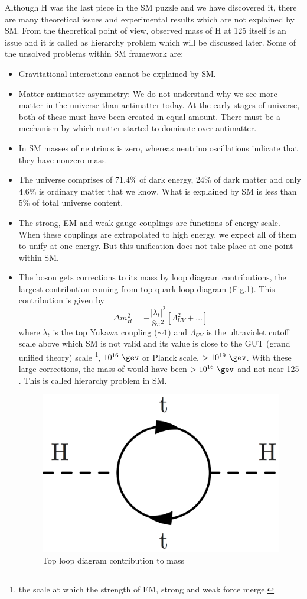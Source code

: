 Although H was the last piece in the SM puzzle and we have discovered it, there are many theoretical issues and experimental results which are not explained by SM. From the theoretical point of view, observed mass of H at 125 \gev itself is an issue and it is called as hierarchy problem which will be discussed later. Some of the unsolved problems within SM framework are:
\begin{itemize}
\item Gravitational interactions cannot be explained by SM.
\item Matter-antimatter asymmetry: We do not understand why we see more matter in the universe than antimatter today. At the early stages of universe, both of these must have been created in equal amount. There must be a mechanism by which matter started to dominate over antimatter.
\item In SM masses of neutrinos is zero, whereas neutrino oscillations \cite{Fukuda:1998mi} indicate that they have nonzero mass.
\item The universe comprises of 71.4\% of dark energy, 24\% of dark matter and only 4.6\% is ordinary matter that we know. What is explained by SM is less than 5\% of total universe content.
\item The strong, EM and weak gauge couplings are functions of energy scale. When these couplings are extrapolated to high energy, we expect all of them to unify at one energy. But this unification does not take place at one point within SM.
\item The \higgs boson gets corrections to its mass by loop diagram contributions, the largest contribution coming from top quark loop diagram (Fig.\ref{fig:hierarchy_problem_higgs}). This contribution is given by
\begin{equation}
\Delta m_{H}^2 = -\frac{|\lambda_t|^2}{8\pi^2}[\Lambda_{UV}^2 + \dots]
\label{eqn:HmassCorr}
\end{equation}
where $\lambda_t$ is the top Yukawa coupling ($\sim 1$) and $\Lambda_{UV}$ is the ultraviolet cutoff scale above which SM is not valid and its value is close to the GUT (grand unified theory) scale \footnote{the scale at which the strength of EM, strong and weak force merge.}, $10^{16}\ \gev$ or Planck scale, $> 10^{19}\ \gev$. With these large corrections, the mass of \higgs would have been $> 10^{16}\ \gev$ and not near 125 \gev. This is called hierarchy problem in SM.
\begin{figure}[h!]
\centering
\includegraphics[width=0.35\linewidth]{../Figures/Chap1/hierarchy_problem_higgs.png}
\caption{Top loop diagram contribution to \higgs mass}
\label{fig:hierarchy_problem_higgs}
\end{figure}
\end{itemize}

